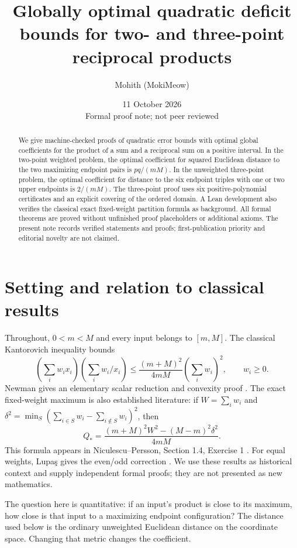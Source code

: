 \documentclass[11pt]{article}
\title{Globally optimal quadratic deficit bounds for two- and three-point reciprocal products}
\author{Mohith (MokiMeow)}
\date{11 October 2026\\\small Formal proof note; not peer reviewed}
\begin{document}
\maketitle
\begin{abstract}
We give machine-checked proofs of quadratic error bounds with optimal global coefficients for
the product of a sum and a reciprocal sum on a positive interval. In the
two-point weighted problem, the optimal coefficient for squared Euclidean
distance to the two maximizing endpoint pairs is $pq/(mM)$. In the
unweighted three-point problem, the optimal coefficient for distance to
the six endpoint triples with one or two upper endpoints is $2/(mM)$. The three-point proof uses
six positive-polynomial certificates and an explicit covering of the
ordered domain. A Lean development also verifies the classical exact
fixed-weight partition formula as background. All formal theorems are
proved without unfinished proof placeholders or additional axioms.
The present note records verified statements and proofs; first-publication
priority and editorial novelty are not claimed.
\end{abstract}

\section{Setting and relation to classical results}
Throughout, $0<m<M$ and every input belongs to $[m,M]$. The classical
Kantorovich inequality bounds
\[
 \left(\sum_i w_i x_i\right)\left(\sum_i w_i/x_i\right)
 \le \frac{(m+M)^2}{4mM}\left(\sum_i w_i\right)^2,
 \qquad w_i\ge0.
\]
Newman gives an elementary scalar reduction and convexity proof
\cite{newman}. The exact fixed-weight maximum is also established
literature: if $W=\sum_i w_i$ and
$\delta^2=\min_S(\sum_{i\in S}w_i-\sum_{i\notin S}w_i)^2$, then
\[
 Q_* = \frac{(m+M)^2 W^2-(M-m)^2\delta^2}{4mM}.
\]
This formula appears in Niculescu--Persson, Section 1.4, Exercise 1
\cite{niculescu}. For equal weights, Lupa\c{s} gives the even/odd correction
\cite{lupas}. We use these results as historical context and supply
independent formal proofs; they are not presented as new mathematics.

The question here is quantitative: if an input's product is close to its
maximum, how close is that input to a maximizing endpoint configuration?
The distance used below is the ordinary unweighted Euclidean distance on
the coordinate space. Changing that metric changes the coefficient.
\end{document}
